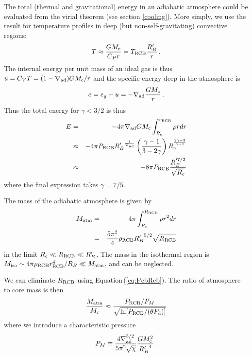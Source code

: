 \documentclass[apj]{emulateapj}
\newcommand{\delad}{\nabla_{\rm ad}}
\newcommand{\Eq}[1]{Equation\,(\ref{#1})}
\newcommand{\Rg}{\mathcal{R}}
\newcommand{\co}{_{\rm c}}
\newcommand{\di}{_{\rm o}}
\newcommand{\cb}{_{\rm RCB}}
\begin{document}
The total (thermal and gravitational) energy in an adiabatic atmosphere could be evaluated from the virial theorem (see section \ref{cooling}).  More simply, we use the result for temperature profiles in deep (but non-self-gravitating) convective regions:
\begin{equation}
T \approx {G M\co \over C_P r} = T\cb {R_B' \over r}\, .
\end{equation} 
The internal energy per unit mass of an ideal gas is thus $u = C_V T = (1 - \delad) G M\co/r$ and the specific energy  deep in the atmosphere is
\begin{equation}
e = e_g + u = -\delad {GM\co \over r} \, .
\end{equation} 
Thus the total energy for $\gamma < 3/2$ is thus
\begin{eqnarray} 
E &=& - 4 \pi \nabla_{\rm ad} G M\co \int_{R\co}^{r\cb} \rho r dr \\
&\approx& - 4 \pi P\cb {R_B'}^{1 \over \nabla_{\rm ad}} \left(\gamma-1 \over 3 - 2 \gamma\right)  R\co^{2\gamma-3\over \gamma-1}  \\
&\approx& - 8 \pi P\cb {R_B'^{7/2} \over \sqrt{R\co}}
\end{eqnarray} 
where the final expression takes $\gamma = 7/5$. %

The mass of the adiabatic atmosphere is given by
\begin{eqnarray} 
\label{eq:Matman}
M_{\rm atm} &=& 4 \pi \int_{R\co}^{R\cb} \rho r^2 dr \\
&=& {5 \pi^2 \over 4} \rho\cb {R_B'}^{5/2} \sqrt{R\cb} %
\end{eqnarray}
in the limit $R\co \ll R\cb \ll R_B'$. The mass in the isothermal region is $M_{\rm iso} \sim 4 \pi \rho\cb r\cb^4/R_B \ll M_{\rm atm}$, and can be neglected.


We can eliminate $R\cb$ using \Eq{eq:PcbRcb}.  The ratio of atmosphere to core mass is then  
\begin{equation} \label{eq:crit}
{M_{\rm atm} \over M\co} \approx {P\cb /P_M \over  \sqrt{\ln[ P\cb/(\theta P_{\rm d})]}}
\end{equation} 
where we introduce a characteristic pressure
\begin{equation} 
P_M \equiv {4 \delad^{3/2} \over 5 \pi^2 \sqrt{\chi} } {G M\co^2 \over {R_B'}^4}\, .
\end{equation} 
\end{document}
